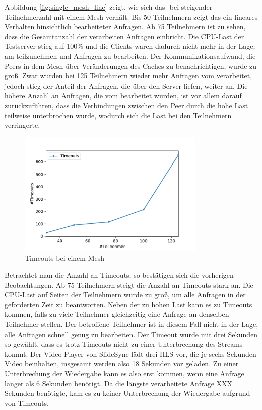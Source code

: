 Abbildung \ref{fig:single_mesh_line} zeigt, wie sich das \pTp-\cdn bei steigender Teilnehmerzahl mit einem Mesh verhält. Bis 50 Teilnehmern zeigt das \cdn ein lineares Verhalten hinsichtlich bearbeiteter Anfragen. Ab 75 Teilnehmern ist zu sehen, dass die Gesamtanzahl der verarbeiten Anfragen einbricht. Die CPU-Last der Testserver stieg auf 100\% und die Clients waren dadurch nicht mehr in der Lage, am \cdn teilzunehmen und Anfragen zu bearbeiten. Der Kommunikationsaufwand, die Peers in dem Mesh über Veränderungen des Caches zu benachrichtigen, wurde zu groß. Zwar wurden bei 125 Teilnehmern wieder mehr Anfragen vom \cdn verarbeitet, jedoch stieg der Anteil der Anfragen, die über den Server liefen, weiter an. Die höhere Anzahl an Anfragen, die vom \cdn bearbeitet wurden, ist vor allem darauf zurückzuführen, dass die Verbindungen zwischen den Peer durch die hohe Last teilweise unterbrochen wurde, wodurch sich die Last bei den Teilnehmern verringerte.   

\begin{figure}[!h]
	\centering
	\includegraphics[width=0.8\textwidth]{figures/timeouts_single}
	\caption[A Figure Short-Title]{Timeouts bei einem Mesh}
	\label{fig:timeouts_single}
\end{figure}

Betrachtet man die Anzahl an Timeouts, so bestätigen sich die vorherigen Beobachtungen. Ab 75 Teilnehmern steigt die Anzahl an Timeouts stark an. Die CPU-Last auf Seiten der Teilnehmern wurde zu groß, um alle Anfragen in der geforderten Zeit zu beantworten. Neben der zu hohen Last kann es zu Timeouts kommen, falls zu viele Teilnehmer gleichzeitig eine Anfrage an denselben Teilnehmer stellen. Der betroffene Teilnehmer ist in diesem Fall nicht in der Lage, alle Anfragen schnell genug zu bearbeiten. Der Timeout wurde mit drei Sekunden so gewählt, dass es trotz Timeouts nicht zu einer Unterbrechung des Streams kommt. Der Video Player von SlideSync lädt drei HLS vor, die je sechs Sekunden Video beinhalten, insgesamt werden also 18 Sekunden vor geladen. Zu einer Unterbrechung der Wiedergabe kann es also erst kommen, wenn eine Anfrage länger als 6 Sekunden benötigt. Da die längste verarbeitete Anfrage XXX Sekunden benötigte, kam es zu keiner Unterbrechung der Wiedergabe aufgrund von Timeouts.

